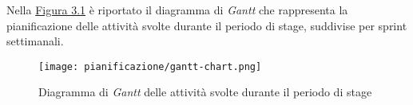 \pagebreak
\noindent Nella {\hyperref[fig:gantt-chart]{Figura 3.1}} è riportato il diagramma di \textit{Gantt} che rappresenta la pianificazione delle attività svolte durante il periodo di stage, suddivise per \gls{sprint} settimanali.\\

\begin{figure}[H]
    \centering
    \texttt{[image: pianificazione/gantt-chart.png]}
    \caption{Diagramma di \textit{Gantt} delle attività svolte durante il periodo di stage}
    \label{fig:gantt-chart}
\end{figure}